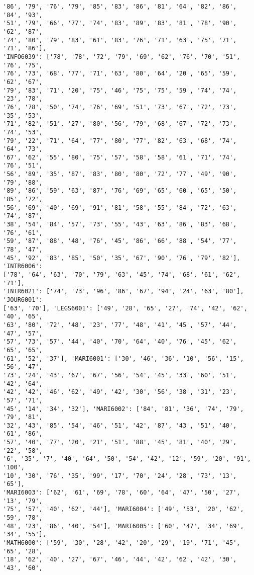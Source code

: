 \documentclass[11pt]{article}
\begin{document}
\begin{Verbatim}[commandchars=\\\{\}]
'86', '79', '76', '79', '85', '83', '86', '81', '64', '82', '86', '84', '93',
'51', '79', '66', '77', '74', '83', '89', '83', '81', '78', '90', '62', '87',
'74', '80', '79', '83', '61', '83', '76', '71', '63', '75', '71', '71', '86'],
'INFO6039': ['78', '78', '72', '79', '69', '62', '76', '70', '51', '76', '75',
'76', '73', '68', '77', '71', '63', '80', '64', '20', '65', '59', '62', '67',
'79', '83', '71', '20', '75', '46', '75', '75', '59', '74', '74', '23', '78',
'76', '78', '50', '74', '76', '69', '51', '73', '67', '72', '73', '35', '53',
'71', '82', '51', '27', '80', '56', '79', '68', '67', '72', '73', '74', '53',
'79', '22', '71', '64', '77', '80', '77', '82', '63', '68', '74', '64', '73',
'67', '62', '55', '80', '75', '57', '58', '58', '61', '71', '74', '76', '51',
'56', '89', '35', '87', '83', '80', '80', '72', '77', '49', '90', '79', '88',
'89', '86', '59', '63', '87', '76', '69', '65', '60', '65', '50', '85', '72',
'56', '69', '40', '69', '91', '81', '58', '55', '84', '72', '63', '74', '87',
'38', '54', '84', '57', '73', '55', '43', '63', '86', '83', '68', '76', '61',
'59', '87', '88', '48', '76', '45', '86', '66', '88', '54', '77', '78', '47',
'45', '92', '83', '85', '50', '35', '67', '90', '76', '79', '82'], 'INTR6006':
['78', '64', '63', '70', '79', '63', '45', '74', '68', '61', '62', '71'],
'INTR6021': ['74', '73', '96', '86', '67', '94', '24', '63', '80'], 'JOUR6001':
['63', '70'], 'LEGS6001': ['49', '28', '65', '27', '74', '42', '62', '40', '65',
'63', '80', '72', '48', '23', '77', '48', '41', '45', '57', '44', '47', '57',
'57', '73', '57', '44', '40', '70', '64', '40', '76', '45', '62', '65', '65',
'61', '52', '37'], 'MARI6001': ['30', '46', '36', '10', '56', '15', '56', '47',
'73', '24', '43', '67', '67', '56', '54', '45', '33', '60', '51', '42', '64',
'42', '42', '46', '62', '49', '42', '30', '56', '38', '31', '23', '57', '71',
'45', '14', '34', '32'], 'MARI6002': ['84', '81', '36', '74', '79', '79', '81',
'32', '43', '85', '54', '46', '51', '42', '87', '43', '51', '40', '61', '86',
'57', '40', '77', '20', '21', '51', '88', '45', '81', '40', '29', '22', '58',
'6', '35', '7', '40', '64', '50', '54', '42', '12', '59', '20', '91', '100',
'10', '30', '76', '35', '99', '17', '70', '24', '28', '73', '13', '65'],
'MARI6003': ['62', '61', '69', '78', '60', '64', '47', '50', '27', '13', '79',
'75', '57', '40', '62', '44'], 'MARI6004': ['49', '53', '20', '62', '59', '78',
'48', '23', '86', '40', '54'], 'MARI6005': ['60', '47', '34', '69', '34', '55'],
'MATH6000': ['59', '30', '28', '42', '20', '29', '19', '71', '45', '65', '28',
'18', '62', '40', '27', '67', '46', '44', '42', '62', '42', '30', '43', '60',

\end{Verbatim}
\end{document}
